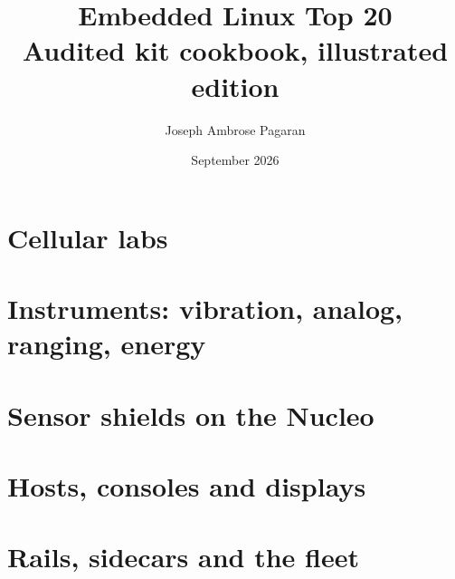 \documentclass[11pt,a4paper]{article}
\title{\sffamily\bfseries Embedded Linux Top 20\\[2pt]\large Audited kit cookbook, illustrated edition}
\author{Joseph Ambrose Pagaran}
\date{September 2026}
\begin{document}
\maketitle
\thispagestyle{empty}

\clearpage
\tableofcontents
\clearpage

\part{Cellular labs}





\part{Instruments: vibration, analog, ranging, energy}





\part{Sensor shields on the Nucleo}




\part{Hosts, consoles and displays}





\part{Rails, sidecars and the fleet}






\appendix
\clearpage

\end{document}
